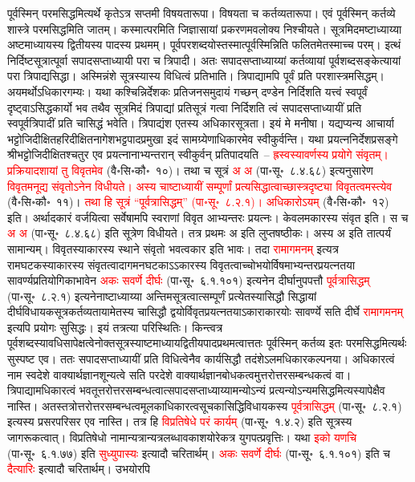 \begin{sloppypar}
पूर्वस्मिन् परमसिद्धमित्यर्थे कृतेऽत्र सप्तमी विषयता\-रूपा। विषयता च कर्तव्यता\-रूपा। एवं पूर्वस्मिन् कर्तव्ये शास्त्रे परमसिद्धमिति जातम्। कस्मात्परमिति जिज्ञासायां प्रकरणमवलोक्य निश्चीयते। सूत्रमिदमष्टाध्याय्या अष्टमाध्यायस्य द्वितीयस्य पादस्य प्रथमम्। पूर्व\-पर\-शब्दयोस्तस्मात्पूर्वस्मिन्निति फलितमेतस्माच्च परम्। इत्थं निर्दिष्ट\-सूत्रात्पूर्वा सपाद\-सप्ताध्यायी परा च त्रिपादी। अतः सपादसप्ताध्याय्यां कर्तव्यायां पूर्व\-शब्द\-सङ्केत्यायां परा त्रिपाद्यसिद्धा। अस्मिन्नंशे सूत्रस्यास्य विधित्वं प्रतिभाति। त्रिपाद्यामपि पूर्वं प्रति परशास्त्रमसिद्धम्। अयमर्थोऽधिकारगम्यः। यथा कश्चिन्निर्देशकः प्रतिजन\-समुदायं गच्छन् दण्डेन निर्दिशति यत्त्वं स्व\-पूर्वं दृष्ट्वाऽसिद्ध\-कार्यो भव तथैव सूत्रमिदं त्रिपाद्यां प्रतिसूत्रं गत्वा निर्दिशति त्वं सपादसप्ताध्यायीं प्रति स्वपूर्वत्रिपादीं प्रति चासिद्धं भवेति। त्रिपाद्यंश एतस्य अधिकार\-सूत्रता। इयं मे मनीषा। यद्यप्यन्य आचार्या भट्टोजि\-दीक्षित\-हरि\-दीक्षित\-नागेश\-भट्टपाद\-प्रमुखा इदं सामग्र्येणाधिकारमेव स्वीकुर्वन्ति। यथा प्रयत्न\-निर्देश\-प्रसङ्गे श्री\-भट्टोजि\-दीक्षितश्चतुर एव प्रयत्नानाभ्यन्तरान् स्वीकुर्वन् प्रतिपादयति~– \textcolor{red}{ह्रस्वस्यावर्णस्य प्रयोगे संवृतम्। प्रक्रिया\-दशायां तु विवृतमेव} (वै॰सि॰कौ॰~१०)। तथा च सूत्रं \textcolor{red}{अ अ} (पा॰सू॰~८.४.६८) इत्यनुसारेण \textcolor{red}{विवृतमनूद्य संवृतोऽनेन विधीयते। अस्य चाष्टाध्यायीं सम्पूर्णां प्रत्यसिद्धात्वाच्छास्त्र\-दृष्ट्या विवृतत्वमस्त्येव} (वै॰सि॰कौ॰~११)। \textcolor{red}{तथा हि सूत्रं “पूर्वत्रासिद्धम्” (पा॰सू॰~८.२.१)। अधिकारोऽयम्} (वै॰सि॰कौ॰~१२) इति। अर्थादकारं वर्जयित्वा सर्वेषामपि स्वराणां विवृत आभ्यन्तरः प्रयत्नः। केवलमकारस्य संवृत इति। स च \textcolor{red}{अ अ} (पा॰सू॰~८.४.६८) इति सूत्रेण विधीयते। तत्र प्रथमः अ इति लुप्त\-षष्ठीकः। अस्य अ इति तात्पर्यं सामान्यम्। विवृतस्याकारस्य स्थाने संवृतो भवत्वकार इति भावः। तदा \textcolor{red}{रामागमनम्} इत्यत्र राम\-घटकस्याकारस्य संवृतत्वादागमन\-घटकाऽऽकारस्य विवृतत्वाच्चोभयो\-र्विषमाभ्यन्तर\-प्रयत्नतया सावर्ण्य\-प्रतियोगिकाभावेन \textcolor{red}{अकः सवर्णे दीर्घः} (पा॰सू॰~६.१.१०१) इत्यनेन दीर्घानुपपत्तौ \textcolor{red}{पूर्वत्रासिद्धम्} (पा॰सू॰~८.२.१) इत्यनेनाष्टाध्याय्या अन्तिम\-सूत्रत्वात्सम्पूर्णं प्रत्येतस्यासिद्धौ सिद्धायां दीर्घ\-विधायक\-सूत्र\-कर्तव्यतायामेतस्य चासिद्धौ द्वयोर्विवृत\-प्रयत्नतयाऽकाराकारयोः सावर्ण्ये सति दीर्घे \textcolor{red}{रामागमनम्} इत्यपि प्रयोगः सुसिद्धः। इयं तत्रत्या परिस्थितिः। किन्त्वत्र पूर्व\-शब्दस्यावधि\-सापेक्षत्वेनोक्त\-सूत्रस्याष्टमाध्याय\-द्वितीय\-पाद\-प्रथमत्वात्ततः पूर्वस्मिन् कर्तव्य इतः परमसिद्धमित्यर्थः सुस्पष्ट एव। ततः सपाद\-सप्ताध्यायीं प्रति विधित्वेनैव कार्य\-सिद्धौ तदंशेऽलमधिकार\-कल्पनया। अधिकारत्वं नाम स्व\-देशे वाक्यार्थ\-ज्ञान\-शून्यत्वे सति पर\-देशे वाक्यार्थ\-ज्ञान\-बोधकत्वमुत्तरोत्तर\-सम्बन्धकत्वं वा। त्रिपाद्यामधिकारत्वं भवतूत्तरोत्तर\-सम्बन्धत्वात्सपाद\-सप्ताध्याय्यामन्योऽन्यं प्रत्यन्यो\-ऽन्यमसिद्धमित्यस्यापेक्षैव नास्ति। अतस्तत्रोत्तरोत्तर\-सम्बन्धत्व\-मूलकाधिकारत्व\-सूचकासिद्धि\-विधायकस्य \textcolor{red}{पूर्वत्रासिद्धम्} (पा॰सू॰~८.२.१) इत्यस्य प्रसर\-परिसर एव नास्ति। तत्र हि \textcolor{red}{विप्रतिषेधे परं कार्यम्} (पा॰सू॰~१.४.२) इति सूत्रस्य जागरूकत्वात्। विप्रतिषेधो नामान्यत्रान्यत्र\-लब्धावकाशयोरेकत्र युगपत्प्रवृत्तिः। यथा \textcolor{red}{इको यणचि} (पा॰सू॰~६.१.७७) इति \textcolor{red}{सुध्युपास्यः} इत्यादौ चरितार्थम्। \textcolor{red}{अकः सवर्णे दीर्घः} (पा॰सू॰~६.१.१०१) इति च \textcolor{red}{दैत्यारिः} इत्यादौ चरितार्थम्। उभयोरपि 
\end{sloppypar}
